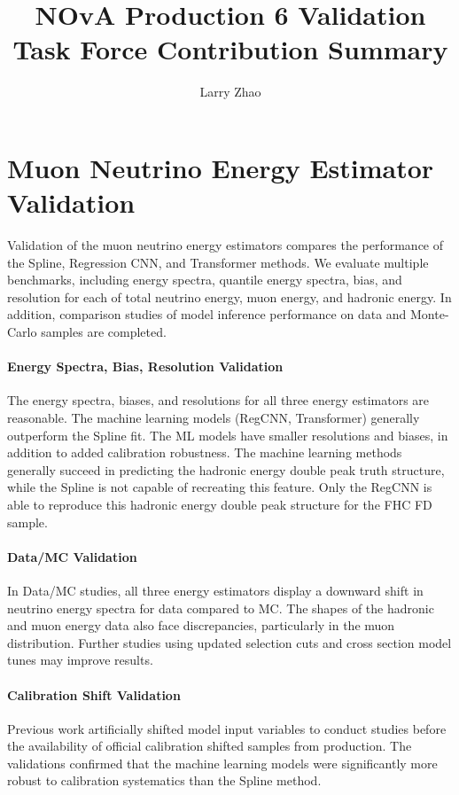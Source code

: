 \documentclass{article}
\title{NOvA Production 6 Validation Task Force Contribution Summary}
\author{Larry Zhao}
\begin{document}
\maketitle

\section{Muon Neutrino Energy Estimator Validation}
Validation of the muon neutrino energy estimators compares the performance of the Spline, Regression CNN, and Transformer methods. We evaluate multiple benchmarks, including energy spectra, quantile energy spectra, bias, and resolution for each of total neutrino energy, muon energy, and hadronic energy. In addition, comparison studies of model inference performance on data and Monte-Carlo samples are completed.

\paragraph{Energy Spectra, Bias, Resolution Validation}
The energy spectra, biases, and resolutions for all three energy estimators are reasonable. The machine learning models (RegCNN, Transformer) generally outperform the Spline fit. The ML models have smaller resolutions and biases, in addition to added calibration robustness. The machine learning methods generally succeed in predicting the hadronic energy double peak truth structure, while the Spline is not capable of recreating this feature. Only the RegCNN is able to reproduce this hadronic energy double peak structure for the FHC FD sample.

\paragraph{Data/MC Validation}
In Data/MC studies, all three energy estimators display a downward shift in neutrino energy spectra for data compared to MC. The shapes of the hadronic and muon energy data also face discrepancies, particularly in the muon distribution. Further studies using updated selection cuts and cross section model tunes may improve results.

\paragraph{Calibration Shift Validation}
Previous work artificially shifted model input variables to conduct studies before the availability of official calibration shifted samples from production. The validations confirmed that the machine learning models were significantly more robust to calibration systematics than the Spline method.
\end{document}
